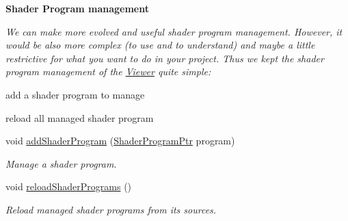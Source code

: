 \begin{Indent}{\bf Shader Program management}\par
{\em We can make more evolved and useful shader program management. However, it would be also more complex (to use and to understand) and maybe a little restrictive for what you want to do in your project. Thus we kept the shader program management of the \hyperlink{classViewer}{Viewer} quite simple\+: \begin{DoxyItemize}
\item add a shader program to manage \item reload all managed shader program \end{DoxyItemize}
}\begin{DoxyCompactItemize}
\item 
void \hyperlink{classViewer_ac900d8f3cc756e9b2687cd58c9ddb6d7}{add\+Shader\+Program} (\hyperlink{ShaderProgram_8hpp_af8e4af1ad4c53875ee5d32ab7e1f4966}{Shader\+Program\+Ptr} program)
\begin{DoxyCompactList}\small\item\em Manage a shader program. \end{DoxyCompactList}\item 
void \hyperlink{classViewer_a692ef0144fbf7511caccefd9a37b43b1}{reload\+Shader\+Programs} ()
\begin{DoxyCompactList}\small\item\em Reload managed shader programs from its sources. \end{DoxyCompactList}\end{DoxyCompactItemize}
\end{Indent}
